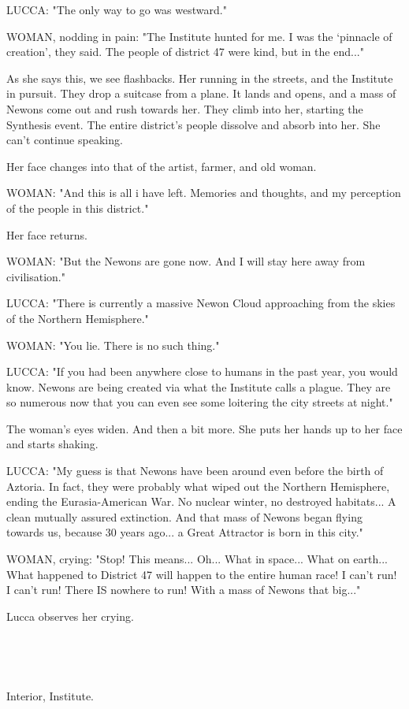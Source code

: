 \documentclass[11pt]{article}
\begin{document}
LUCCA: "The only way to go was westward."

WOMAN, nodding in pain: "The Institute hunted for me. 
I was the `pinnacle of creation', they said.
The people of district 47 were kind, but in the end..."

As she says this, we see flashbacks.
Her running in the streets, and the Institute in pursuit.
They drop a suitcase from a plane.
It lands and opens, and a mass of Newons come out and rush towards her.
They climb into her, starting the Synthesis event.
The entire district's people dissolve and absorb into her.
She can't continue speaking.

Her face changes into that of the artist, farmer, and old woman.

WOMAN: "And this is all i have left.
Memories and thoughts, and my perception of the people in this district."

Her face returns.

WOMAN: "But the Newons are gone now. 
And I will stay here away from civilisation."

LUCCA: "There is currently a massive Newon Cloud approaching from the skies of the Northern Hemisphere."

WOMAN: "You lie. There is no such thing."

LUCCA: "If you had been anywhere close to humans in the past year, you would know.
Newons are being created via what the Institute calls a plague.
They are so numerous now that you can even see some loitering the city streets at night."

The woman’s eyes widen. And then a bit more. She puts her hands up to her face and starts shaking. 

LUCCA: "My guess is that Newons have been around even before the birth of Aztoria.
In fact, they were probably what wiped out the Northern Hemisphere, ending the Eurasia-American War.
No nuclear winter, no destroyed habitats... A clean mutually assured extinction.
And that mass of Newons began flying towards us, because 30 years ago... a Great Attractor is born in this city."

WOMAN, crying: "Stop! This means... Oh... What in space... What on earth...
What happened to District 47 will happen to the entire human race!
I can't run! 
I can't run!
There IS nowhere to run!
With a mass of Newons that big..."

Lucca observes her crying.

\ 

\ 

Interior, Institute.
\end{document}
